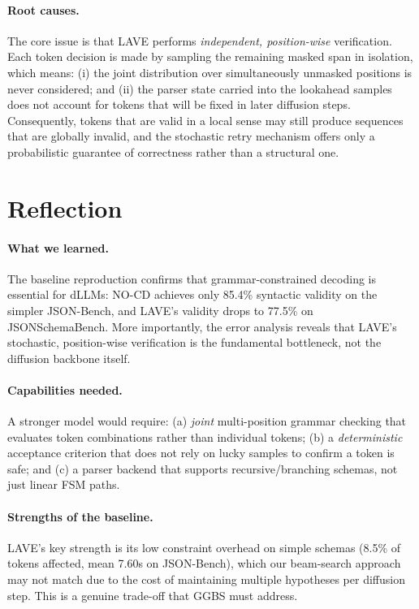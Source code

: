 \paragraph{Root causes.}
The core issue is that LAVE performs \emph{independent, position-wise} verification. Each token decision is made by sampling the remaining masked span in isolation, which means: (i) the joint distribution over simultaneously unmasked positions is never considered; and (ii) the parser state carried into the lookahead samples does not account for tokens that will be fixed in later diffusion steps. Consequently, tokens that are valid in a local sense may still produce sequences that are globally invalid, and the stochastic retry mechanism offers only a probabilistic guarantee of correctness rather than a structural one.


\section{Reflection}

\paragraph{What we learned.}
The baseline reproduction confirms that grammar-constrained decoding is essential for dLLMs: NO-CD achieves only 85.4\% syntactic validity on the simpler JSON-Bench, and LAVE’s validity drops to 77.5\% on JSONSchemaBench. More importantly, the error analysis reveals that LAVE’s stochastic, position-wise verification is the fundamental bottleneck, not the diffusion backbone itself.

\paragraph{Capabilities needed.}
A stronger model would require: (a) \emph{joint} multi-position grammar checking that evaluates token combinations rather than individual tokens; (b) a \emph{deterministic} acceptance criterion that does not rely on lucky samples to confirm a token is safe; and (c) a parser backend that supports recursive/branching schemas, not just linear FSM paths.

\paragraph{Strengths of the baseline.}
LAVE’s key strength is its low constraint overhead on simple schemas (8.5\% of tokens affected, mean 7.60s on JSON-Bench), which our beam-search approach may not match due to the cost of maintaining multiple hypotheses per diffusion step. This is a genuine trade-off that GGBS must address.

